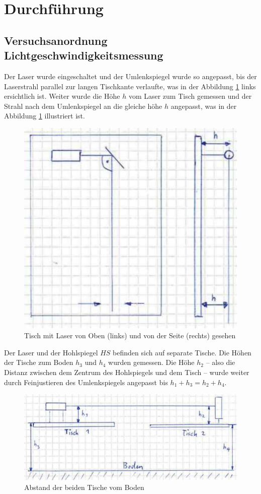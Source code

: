 \section{Durchf\"uhrung}

\subsection{Versuchsanordnung Lichtgeschwindigkeitsmessung}

Der Laser  wurde eingeschaltet und  der Umlenkspiegel wurde so  angepasst, bis
der Laserstrahl parallel zur langen Tischkante verlaufte, was in der Abbildung
\ref{fig:laser-angle} links  ersichtlich ist. Weiter wurde die  H\"ohe $h$ vom
Laser zum Tisch gemessen und der  Strahl nach dem Umlenkspiegel an die gleiche
h\"ohe $h$  angepasst, was in der  Abbildung \ref{fig:laser-angle} illustriert
ist.

\begin{figure}[H]
    \center
    \includegraphics[width=.5\textwidth]{images/laser-angle.pdf}
    \caption{Tisch mit Laser von Oben (links) und von der Seite (rechts) gesehen}
    \label{fig:laser-angle}
\end{figure}

Der  Laser und  der Hohlspiegel  $HS$  befinden sich  auf separate  Tische. Die
H\"ohen der Tische zum Boden $h_3$ und $h_4$ wurden gemessen. Die H\"ohe $h_2$
-- also  die Distanz  zwischen dem  Zentrum des Hohlspiegels  und dem  Tisch --
wurde weiter durch  Feinjustieren des Umlenkspiegels angepasst  bis $h_1+h_3 =
h_2+h_4$.

\begin{figure}[H]
    \center
    \includegraphics[width=.8\textwidth]{images/laser-height.pdf}
    \caption{Abstand der beiden Tische vom Boden}
    \label{fig:laser-height}
\end{figure}

